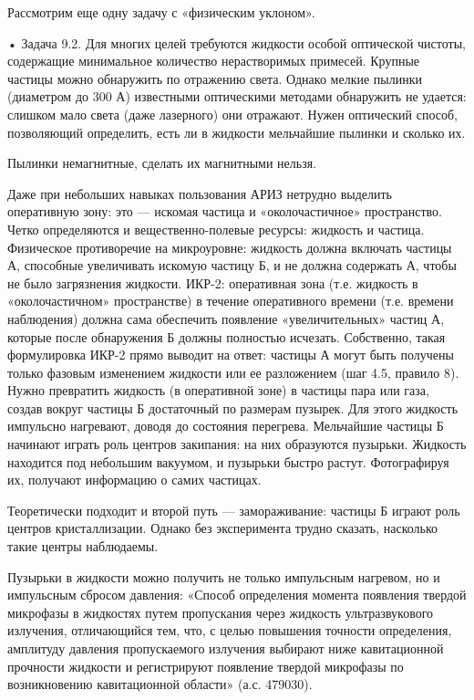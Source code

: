 Рассмотрим еще одну задачу с «физическим уклоном».

• Задача  9.2. Для многих  целей требуются жидкости  особой оптической
чистоты,  содержащие  минимальное количество  нерастворимых  примесей.
Крупные  частицы можно  обнаружить по  отражению света.  Однако мелкие
пылинки  (диаметром   до  300   А)  известными   оптическими  методами
обнаружить  не  удается:  слишком  мало  света  (даже  лазерного)  они
отражают. Нужен  оптический способ, позволяющий определить,  есть ли в
жидкости мельчайшие пылинки и сколько их.

Пылинки немагнитные, сделать их магнитными нельзя.

Даже  при   небольших  навыках  пользования  АРИЗ   нетрудно  выделить
оперативную   зону:  это   —   искомая   частица  и   «околочастичное»
пространство.  Четко   определяются  и   вещественно-полевые  ресурсы:
жидкость и  частица. Физическое противоречие на  микроуровне: жидкость
должна включать частицы А, способные  увеличивать искомую частицу Б, и
не  должна содержать  А, чтобы  не было  загрязнения жидкости.  ИКР-2:
оперативная  зона  (т.е.  жидкость  в  «околочастичном»  пространстве)
в  течение  оперативного  времени  (т.е.  времени  наблюдения)  должна
сама   обеспечить  появление   «увеличительных»   частиц  А,   которые
после  обнаружения  Б  должны полностью  исчезать.  Собственно,  такая
формулировка  ИКР-2  прямо выводит  на  ответ:  частицы А  могут  быть
получены только  фазовым изменением  жидкости или ее  разложением (шаг
4.5,  правило 8).  Нужно превратить  жидкость (в  оперативной зоне)  в
частицы  пара  или  газа,  создав  вокруг  частицы  Б  достаточный  по
размерам  пузырек.  Для  этого жидкость  импульсно  нагревают,  доводя
до  состояния перегрева.  Мельчайшие  частицы Б  начинают играть  роль
центров  закипания: на  них  образуются  пузырьки. Жидкость  находится
под  небольшим вакуумом,  и пузырьки  быстро растут.  Фотографируя их,
получают информацию о самих частицах.

Теоретически подходит и второй путь  — замораживание: частицы Б играют
роль центров  кристаллизации. Однако без эксперимента  трудно сказать,
насколько такие центры наблюдаемы.

Пузырьки в жидкости можно получить не только импульсным нагревом, но и
импульсным  сбросом давления:  «Способ  определения момента  появления
твердой  микрофазы  в  жидкостях   путем  пропускания  через  жидкость
ультразвукового излучения,  отличающийся тем,  что, с  целью повышения
точности  определения,  амплитуду   давления  пропускаемого  излучения
выбирают   ниже  кавитационной   прочности  жидкости   и  регистрируют
появление  твердой микрофазы  по возникновению  кавитационной области»
(а.с. 479030).

